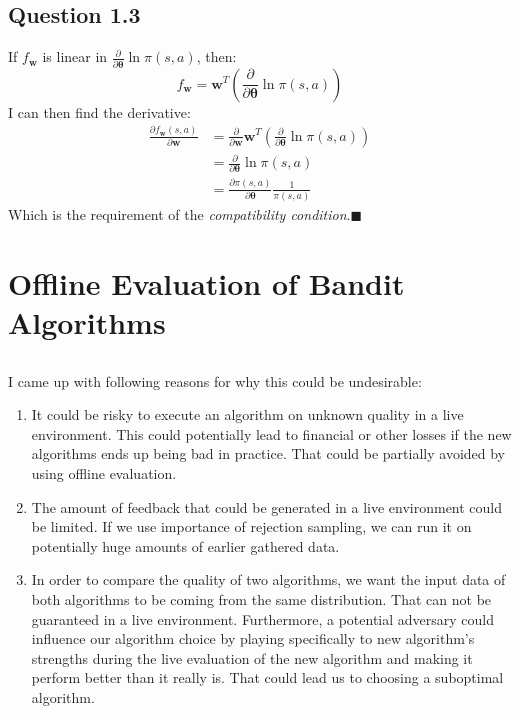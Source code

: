 \documentclass[a4paper]{article}
\newcommand*{\QEDA}{\hfill\ensuremath{\blacksquare}}%
\newcommand*{\bs}[1]{\boldsymbol{#1}}
\begin{document}
\subsection*{Question 1.3}
\label{subsec:13}
If $f_{\boldsymbol{w}}$ is linear in $\frac{\partial}{\partial
  \boldsymbol{\theta}} \ln \pi(s, a)$, then: 
\[
f_{\boldsymbol{w}} = \bs{w}^T \left(\frac{\partial}{\partial \boldsymbol{\theta}} \ln \pi(s, a)\right)
\]
I can then find the derivative:
\begin{align*}
  \frac{\partial f_{\bs{w}} (s,a)}{\partial \boldsymbol{w}} &=
  \frac{\partial}{\partial \boldsymbol{w}} \bs{w}^T
  \left(\frac{\partial}{\partial \boldsymbol{\theta}} \ln \pi(s, a)\right)\\
  &=
  \frac{\partial}{\partial \boldsymbol{\theta}} \ln \pi(s, a)\\
  &= \frac{\partial \pi(s,a)}{\partial
    \bs{\theta}}\frac{1}{\pi(s, a)} \tag{using chain rule}
\end{align*}
Which is the requirement of the \emph{compatibility condition}.\QEDA

\section{Offline Evaluation of Bandit Algorithms}
\label{sec:2}
\subsection{}
\label{subsec:21}
I came up with following reasons for why this could be undesirable:
\begin{enumerate}
\item It could be risky to execute an algorithm on unknown quality in a live environment.
  This could potentially lead to financial or other losses if the new
  algorithms ends up being bad in practice. That could be partially avoided by
  using offline evaluation.
\item The amount of feedback that could be generated in a live environment could
  be limited. If we use importance of rejection sampling, we can run it on
  potentially huge amounts of earlier gathered data. 
\item In order to compare the quality of two algorithms, we want the input data
  of both algorithms to be coming from the same distribution. That can not be
  guaranteed in a live environment. Furthermore, a potential adversary could
  influence our algorithm choice by playing specifically to new algorithm's
  strengths during the live evaluation of the new algorithm and making it
  perform better than it really is. That could lead us to choosing a suboptimal
  algorithm.
\end{enumerate}
\end{document}
